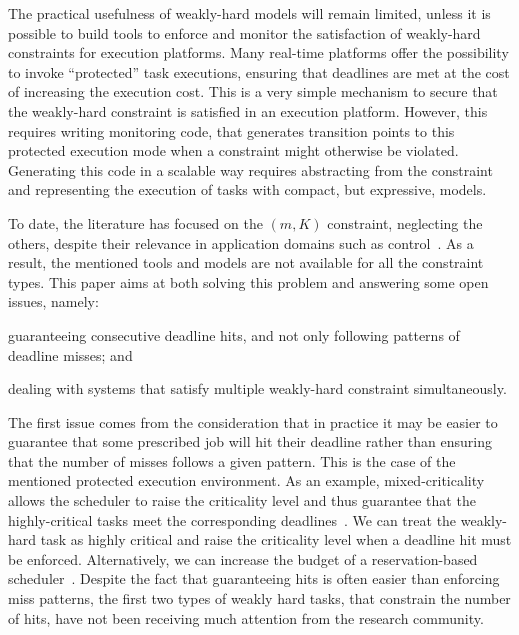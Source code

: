 The practical usefulness of weakly-hard models will remain limited, unless it is possible to build tools to enforce and monitor the satisfaction of weakly-hard constraints for execution platforms.
Many real-time platforms offer the possibility to invoke ``protected'' task executions, ensuring that deadlines are met at the cost of increasing the execution cost.
This is a very simple mechanism to secure that the weakly-hard constraint is satisfied in an execution platform.
However, this requires writing monitoring code, that generates transition points to this protected execution mode when a constraint might otherwise be violated.
Generating this code in a scalable way requires abstracting from the constraint and representing the execution of tasks with compact, but expressive, models.

To date, the literature has focused on the $(m,K)$ constraint, neglecting the others, despite their relevance in application domains such as control~\cite{Maggio:2020, Linsenmayer:2017, Vreman:2021}.
As a result, the mentioned tools and models are not available for all the constraint types.
This paper aims at both solving this problem and answering some open issues, namely:
\begin{enumerate*}[label=(\roman*)]
    \item guaranteeing consecutive deadline hits, and not only following patterns of deadline misses; and
    \item dealing with systems that satisfy multiple weakly-hard constraint simultaneously.
\end{enumerate*}

The first issue comes from the consideration that in practice it may be easier to guarantee that some prescribed job will hit their deadline rather than ensuring that the number of misses follows a given pattern. 
This is the case of the mentioned protected execution environment. 
As an example, mixed-criticality allows the scheduler to raise the criticality level and thus guarantee that the highly-critical tasks meet the corresponding deadlines~\cite{Burns:2013}. 
We can treat the weakly-hard task as highly critical and raise the criticality level when a deadline hit must be enforced. 
Alternatively, we can increase the budget of a reservation-based scheduler~\cite{Casini:2019}.
Despite the fact that guaranteeing hits is often easier than enforcing miss patterns, the first two types of weakly hard tasks, that constrain the number of hits, have not been receiving much attention from the research community.

